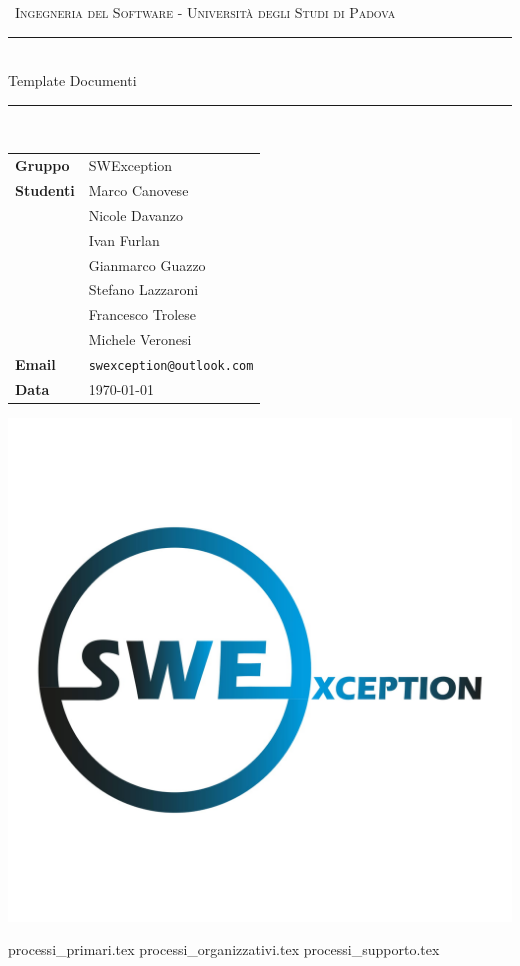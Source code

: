 \documentclass[12pt,italian,a4paper]{article}
\begin{document}
	
	
	\begin{titlepage}
		\clearpage\thispagestyle{empty}
		\centering
		\vspace{1cm}
		
		{\
			\textsc{Ingegneria del Software - Università degli Studi di Padova}
		}
		\vspace{2.5cm}
		
		\rule{\linewidth}{2mm} \\[0.8cm]
		{ \LARGE \sc Template Documenti}\\[0.55cm]
		\rule{\linewidth}{0.6mm} \\[3.4cm]
		
		\hspace{2cm}
		\begin{tabular}{l p{5cm}}
			\textbf{Gruppo} & SWException \\[10pt]
			\textbf{Studenti} & Marco Canovese \\ & Nicole Davanzo \\ & Ivan Furlan \\ & Gianmarco Guazzo \\ & Stefano Lazzaroni \\ & Francesco Trolese \\ & Michele Veronesi \\[10pt]
			\textbf{Email} & \texttt{swexception@outlook.com} \\[10pt]
			\textbf{Data} & \today \\            
		\end{tabular}
		
		
		\vfill
		\centering \includegraphics[scale=0.18]{logo.jpg}
	\end{titlepage}
	\tableofcontents
	
	\newpage
	

	{processi_primari.tex}
	\newpage
	{processi_organizzativi.tex}
	\newpage
	{processi_supporto.tex}
\end{document}

